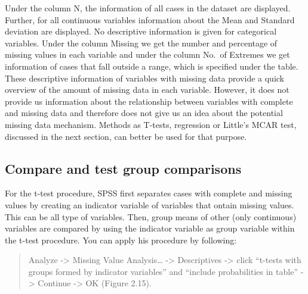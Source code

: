 \documentclass[
]{book}
\begin{document}
Under the column N, the information of all cases in the dataset are
displayed. Further, for all continuous variables information about the
Mean and Standard deviation are displayed. No descriptive information is
given for categorical variables. Under the column Missing we get the
number and percentage of missing values in each variable and under the
column No.~of Extremes we get information of cases that fall outside a
range, which is specified under the table. These descriptive information
of variables with missing data provide a quick overview of the amount of
missing data in each variable. However, it does not provide us
information about the relationship between variables with complete and
missing data and therefore does not give us an idea about the potential
missing data mechanism. Methods as T-tests, regression or Little's MCAR
test, discussed in the next section, can better be used for that
purpose.

\hypertarget{compare-and-test-group-comparisons}{%
\subsection{Compare and test group
comparisons}\label{compare-and-test-group-comparisons}}

For the t-test procedure, SPSS first separates cases with complete and
missing values by creating an indicator variable of variables that
ontain missing values. This can be all type of variables. Then, group
means of other (only continuous) variables are compared by using the
indicator variable as group variable within the t-test procedure. You
can apply his procedure by following:

\begin{quote}
Analyze -\textgreater{} Missing Value Analysis\ldots{} -\textgreater{}
Descriptives -\textgreater{} click ``t-tests with groups formed by
indicator variables'' and ``include probabilities in table''
-\textgreater{} Continue -\textgreater{} OK (Figure 2.15).
\end{quote}
\end{document}
